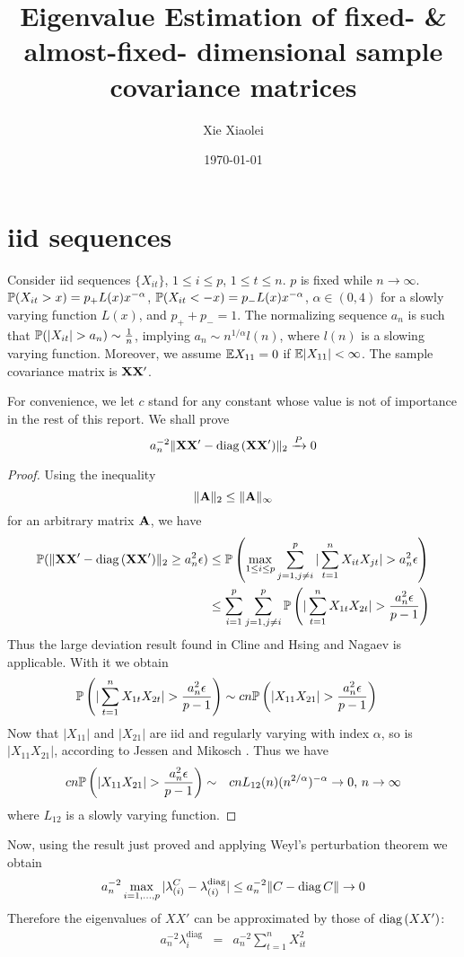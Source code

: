 \documentclass{article}
\title{Eigenvalue Estimation of fixed- \& almost-fixed- dimensional
  sample covariance matrices}
\author{Xie Xiaolei}
\date{\today}
\begin{document}
\maketitle
\section{iid sequences}\label{sec:iid}
Consider iid sequences $\{X_{it}\}$, $1 \leq i \leq p$, $1 \leq t \leq
n$. $p$ is fixed while $n \to \infty$. $\P(X_{it} > x) = p_+ L(x)
x^{-\alpha}$, $\P(X_{it} < -x) = p_- L(x) x^{-\alpha}$, $\alpha \in
(0,4)$ for a slowly varying function $L(x)$, and $p_+ + p_- = 1$. The
normalizing sequence $a_n$ is such that $\P(|X_{it}| > a_n) \sim {1
  \over n}$, implying $a_n \sim n^{1/\alpha} l(n)$, where $l(n)$ is a
slowing varying function. Moreover, we assume $\E X_{11} = 0$ if $\E
|X_{11}| < \infty$. The sample covariance matrix is $\mtx
{XX'}$.

For convenience, we let $c$ stand for any constant whose value is not
of importance in the rest of this report. We shall prove
\[
a_n^{-2}\|\mtx {XX'} - \diag(\mtx {XX'})\|_2 \xrightarrow{P} 0
\]

\begin{proof}
  Using the inequality
  \[
  \|\mtx A\|_2 \leq \|\mtx A\|_\infty
  \]
  for an arbitrary matrix $\mtx A$, we have
  \begin{align*}
    \P(\|\mtx {XX'} - \diag(\mtx {XX'})\|_2 \geq a_n^2 \epsilon) & \leq
    \P\left(\max_{1\leq i \leq p} \sum_{j=1, j\neq i}^p |\sum_{t=1}^n
    X_{it} X_{jt}| > a_n^2 \epsilon\right) \\
    &\leq \sum_{i=1}^p \sum_{j=1, j\neq i}^p \P\left(|\sum_{t=1}^n
    X_{1t} X_{2t}| > {a_n^2 \epsilon \over p-1}\right) \\
  \end{align*}
  Thus the large deviation result found in Cline and Hsing
  \cite{ClingHsing1998} and Nagaev \cite{nagaev1979} is
  applicable. With it we obtain
  \begin{align*}
    \P\left(|\sum_{t=1}^n X_{1t} X_{2t}| > {a_n^2 \epsilon \over p-1}\right)
    &\sim
    c n \P\left(|X_{11} X_{21}| > {a_n^2 \epsilon \over p-1 }\right)
  \end{align*}
  Now that $|X_{11}|$ and $|X_{21}|$ are iid and regularly varying
  with index $\alpha$, so is $|X_{11} X_{21}|$, according to Jessen
  and Mikosch \cite{JessenMikosch2006}. Thus we have
  \begin{eqnarray*}
    c n \P\left(|X_{11} X_{21}| > {a_n^2 \epsilon \over p-1 }\right)
    &\sim& c n L_{12}(n) (n^{2/\alpha})^{-\alpha} \to 0\text{,  }n\to\infty
  \end{eqnarray*}
  where $L_{12}$ is a slowly varying function.
\end{proof}
Now, using the result just proved and applying Weyl's perturbation
theorem we obtain
\[
a_n^{-2} \max_{i=1,\dots,p} |\lambda^C_{(i)} -
\lambda^{\text{diag}}_{(i)}| \leq  a_n^{-2}\|C - \diag{C}\| \to 0
\]
Therefore the eigenvalues of $XX'$ can be approximated by those of
$\diag(XX')$:
\begin{eqnarray*}
a_n^{-2}\lambda^{\text{diag}}_{i}  &=& a_n^{-2} \sum_{t=1}^n X_{it}^2
\end{eqnarray*}
\end{document}

